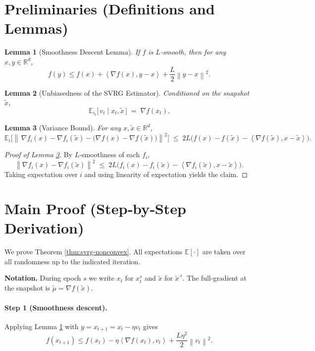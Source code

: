 \documentclass[11pt]{article}
\newtheorem{lemma}{Lemma}
\newcommand{\E}{\mathbb{E}}
\newcommand{\R}{\mathbb{R}}
\newcommand{\norm}[1]{\left\|#1\right\|}
\newcommand{\inner}[2]{\left\langle #1,#2 \right\rangle}
\begin{document}
\section*{Preliminaries (Definitions and Lemmas)}
\begin{lemma}[Smoothness Descent Lemma]\label{lem:smooth-descent}
If $f$ is $L$‑smooth, then for any $x,y\in\R^{d}$,
\[
f(y)\le f(x)+\inner{\nabla f(x)}{y-x}+\frac{L}{2}\norm{y-x}^{2}.
\]
\end{lemma}
\begin{lemma}[Unbiasedness of the SVRG Estimator]\label{lem:unbiased}
Conditioned on the snapshot $\tilde{x}$,
\[
\E_{i_t}\!\bigl[\,v_t\mid x_t,\tilde{x}\,\bigr]
\;=\;
\nabla f(x_t).
\]
\end{lemma}
\begin{lemma}[Variance Bound]\label{lem:var-bound}
For any $x,\tilde{x}\in\R^{d}$,
\[
\E_{i}\!\bigl[\norm{\,\nabla f_i(x)-\nabla f_i(\tilde{x})-\bigl(\nabla f(x)-\nabla f(\tilde{x})\bigr)}^{2}\bigr]
\;\le\;
2L\bigl(f(x)-f(\tilde{x})-\inner{\nabla f(\tilde{x})}{x-\tilde{x}}\bigr).
\]
\end{lemma}
\begin{proof}[Proof of Lemma \ref{lem:var-bound}]
By $L$‑smoothness of each $f_i$,
\[
\norm{\nabla f_i(x)-\nabla f_i(\tilde{x})}^{2}
\;\le\;
2L\bigl(f_i(x)-f_i(\tilde{x})-\inner{\nabla f_i(\tilde{x})}{x-\tilde{x}}\bigr).
\]
Taking expectation over $i$ and using linearity of expectation yields the claim. \qedhere
\end{proof}

\section*{Main Proof (Step‑by‑Step Derivation)}
We prove Theorem \ref{thm:svrg-nonconvex}.  
All expectations $\E[\cdot]$ are taken over all randomness up to the indicated iteration.

\noindent\textbf{Notation.}
During epoch $s$ we write $x_t$ for $x^{s}_{t}$ and $\tilde{x}$ for $\tilde{x}^{\,s}$.
The full‑gradient at the snapshot is $\tilde{\mu}=\nabla f(\tilde{x})$.

\paragraph{Step 1 (Smoothness descent).}
Applying Lemma \ref{lem:smooth-descent} with $y=x_{t+1}=x_t-\eta v_t$ gives
\[
f(x_{t+1})
\le f(x_t)-\eta\inner{\nabla f(x_t)}{v_t}
+\frac{L\eta^{2}}{2}\norm{v_t}^{2}.
\tag{2}
\]
\end{document}

